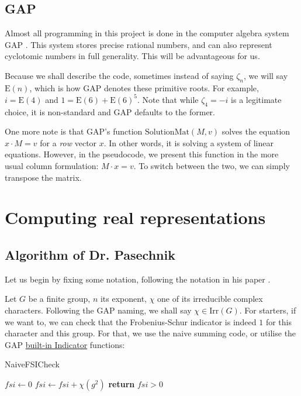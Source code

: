 \documentclass[11pt]{article}
\begin{document}
\subsection{GAP}

Almost all programming in this project is done in the computer algebra system GAP
\cite{GAP4}. This system stores precise rational numbers, and can also represent
cyclotomic numbers in full generality. This will be advantageous for us.

Because we shall describe the code, sometimes instead of saying $\zeta_n$, we
will say $\text{E}(n)$, which is how GAP denotes these primitive roots. For
example, $i = \text{E}(4)$ and $1 = \text{E}(6) + \text{E}(6)^5$. Note that while
$\zeta_4 = -i$ is a legitimate choice, it is non-standard and GAP defaults
to the former.

One more note is that GAP's function $\text{SolutionMat}(M, v)$ solves the equation
$x \cdot M = v$ for a \textit{row} vector $x$. In other words, it is solving a system
of linear equations. However, in the pseudocode, we present this function in the
more usual column formulation: $M \cdot x = v$. To switch between
the two, we can simply transpose the matrix.

\newpage

\section{Computing real representations}

\subsection{Algorithm of Dr. Pasechnik}

Let us begin by fixing some notation, following the notation in his paper \cite{Pas21}.

Let $G$ be a finite group, $n$ its exponent, $\chi$ one of its irreducible complex characters. 
Following the GAP naming, we shall say $\chi \in \text{Irr}(G)$. For starters, if we want to,
we can check that the Frobenius-Schur indicator is indeed $1$ for this character and this group.
For that, we use the naive summing code, or utilise the GAP
\href{https://docs.gap-system.org/doc/ref/chap71_mj.html#X7FD3D3047DE6381E}{built-in Indicator} functions:

\begin{algorithm}
  \caption{NaiveFSICheck}
  \begin{algorithmic}
    \State $fsi \gets 0$
      \State $fsi \gets fsi + \chi(g^2)$
    \EndFor
    \State \textbf{return} $fsi > 0$
  \end{algorithmic}
\end{algorithm}
\end{document}
